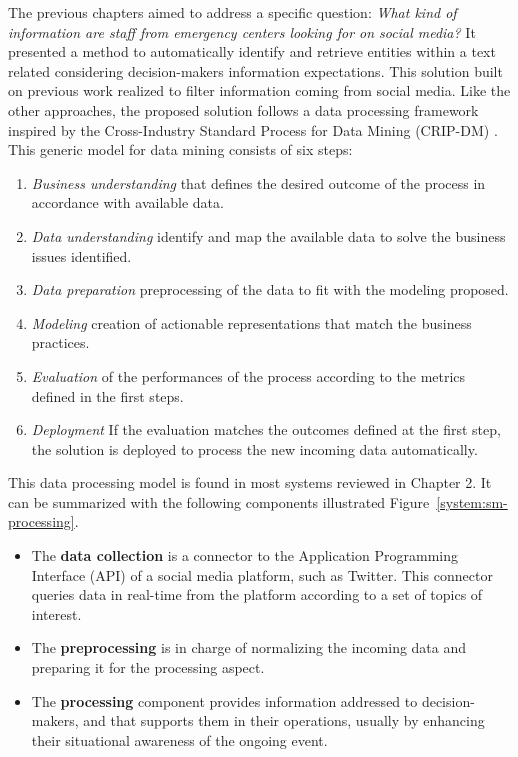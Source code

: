 The previous chapters aimed to address a specific question: \emph{What kind of information are staff from emergency centers looking for on social media?}
It presented a method to automatically identify and retrieve entities within a text related considering decision-makers information expectations.
This solution built on previous work realized to filter information coming from social media.
Like the other approaches, the proposed solution follows a data processing framework inspired by the Cross-Industry Standard Process for Data Mining (CRIP-DM) \parencite{shearerCRISPDMModelNew2000}.
This generic model for data mining consists of six steps:
\begin{enumerate}
    \item \emph{Business understanding} that defines the desired outcome of the process in accordance with available data.
    \item \emph{Data understanding} identify and map the available data to solve the business issues identified.
    \item \emph{Data preparation} preprocessing of the data to fit with the modeling proposed.
    \item \emph{Modeling} creation of actionable representations that match the business practices.
    \item \emph{Evaluation} of the performances of the process according to the metrics defined in the first steps.
    \item \emph{Deployment} If the evaluation matches the outcomes defined at the first step, the solution is deployed to process the new incoming data automatically.
\end{enumerate}

This data processing model is found in most systems reviewed in Chapter 2.
It can be summarized with the following components illustrated Figure~\ref{system:sm-processing}.

\begin{itemize}
    \item The \textbf{data collection} is a connector to the Application Programming Interface (API) of a social media platform, such as Twitter.
          This connector queries data in real-time from the platform according to a set of topics of interest.
    \item The \textbf{preprocessing} is in charge of normalizing the incoming data and preparing it for the processing aspect.
    \item The \textbf{processing} component provides information addressed to decision-makers, and that supports them in their operations, usually by enhancing their situational awareness of the ongoing event.
\end{itemize}

